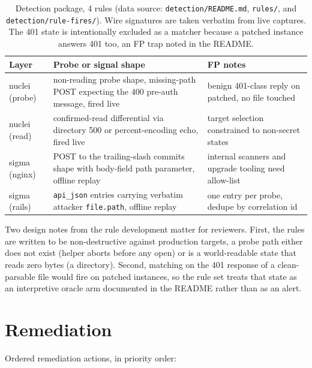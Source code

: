 \documentclass[journal]{IEEEtran}
\begin{document}
\begin{table}[t]
\caption{Detection package, 4 rules
(data source: \texttt{detection/README.md}, \texttt{rules/}, and
\texttt{detection/rule-fires/}). Wire signatures are taken verbatim from live
captures. The 401 state is intentionally excluded as a matcher because a
patched instance answers 401 too, an FP trap noted in the README.}
\centering\footnotesize
\begin{tabular}{p{1.62cm}p{2.75cm}p{2.5cm}}
\toprule
Layer & Probe or signal shape & FP notes \\
\midrule
nuclei (probe) & non-reading probe shape, missing-path POST expecting the 400
pre-auth message, fired live & benign 401-class reply on patched, no file
touched \\
nuclei (read) & confirmed-read differential via directory 500 or
percent-encoding echo, fired live & target selection constrained to
non-secret states \\
sigma (nginx) & POST to the trailing-slash commits shape with body-field
path parameter, offline replay & internal scanners and upgrade tooling need
allow-list \\
sigma (rails) & \texttt{api\_json} entries carrying verbatim attacker
\texttt{file.path}, offline replay & one entry per probe, dedupe by
correlation id \\
\bottomrule
\end{tabular}
\label{tab:detect}
\end{table}

Two design notes from the rule development matter for reviewers. First, the
rules are written to be non-destructive against production targets, a probe
path either does not exist (helper aborts before any open) or is a
world-readable state that reads zero bytes (a directory). Second, matching on
the 401 response of a clean-parsable file would fire on patched instances, so
the rule set treats that state as an interpretive oracle arm documented in the
README rather than as an alert.

\section{Remediation}

Ordered remediation actions, in priority order:
\end{document}
